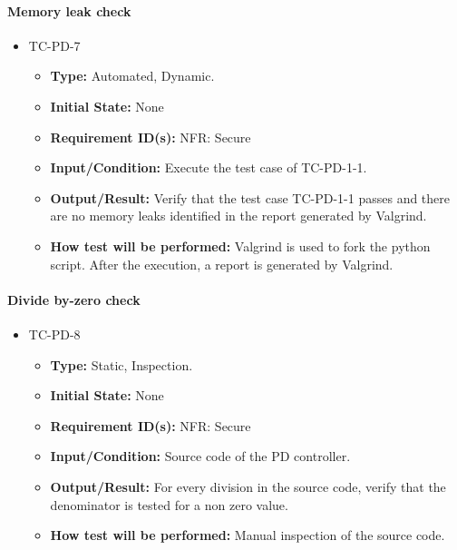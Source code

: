 \documentclass[12pt, titlepage]{article}
\begin{document}
\paragraph{Memory leak check}
\begin{itemize}
\item{TC-PD-7\\}
\begin{itemize}
\item{\textbf{Type:}} Automated, Dynamic.
					
\item{\textbf{Initial State:}} None

\item{\textbf{Requirement ID(s):}} NFR: Secure
					
\item{\textbf{Input/Condition:}}  Execute the test case of TC-PD-1-1.
					
\item{\textbf{Output/Result:}} Verify that the test case TC-PD-1-1 passes and there
are no memory leaks identified in the  report generated by Valgrind.

\item{\textbf{How test will be performed:}} Valgrind \cite{Valgrind} is used to fork
the python script. After the execution, a report is generated by Valgrind. 
\end{itemize}
\end{itemize}

\paragraph{Divide by-zero check}
\begin{itemize}
\item{TC-PD-8\\}
\begin{itemize}
\item{\textbf{Type:}} Static, Inspection.
					
\item{\textbf{Initial State:}} None

\item{\textbf{Requirement ID(s):}}  NFR: Secure
					
\item{\textbf{Input/Condition:}}  Source code of the PD controller.
					
\item{\textbf{Output/Result:}} For every division in the source code, verify that
the denominator is tested for a non zero value. 

\item{\textbf{How test will be performed:}}  Manual inspection of the source code.
\end{itemize}
\end{itemize}
\end{document}

